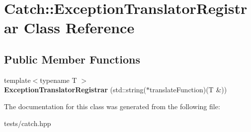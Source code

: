 \hypertarget{class_catch_1_1_exception_translator_registrar}{}\section{Catch\+:\+:Exception\+Translator\+Registrar Class Reference}
\label{class_catch_1_1_exception_translator_registrar}
\subsection*{Public Member Functions}
\begin{DoxyCompactItemize}
\item 
\mbox{\label{class_catch_1_1_exception_translator_registrar_aa73229de911f26b1df6c6c87c4d9e04e}} 
{\footnotesize template$<$typename T $>$ }\\{\bfseries Exception\+Translator\+Registrar} (std\+::string($\ast$translate\+Function)(T \&))
\end{DoxyCompactItemize}


The documentation for this class was generated from the following file\+:\begin{DoxyCompactItemize}
\item 
tests/catch.\+hpp\end{DoxyCompactItemize}
